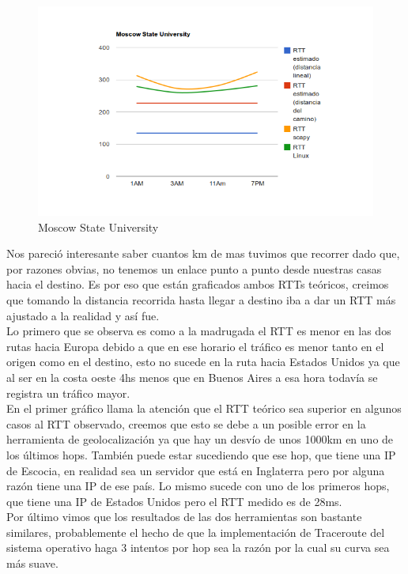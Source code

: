 \begin{figure}[h!]
    \centering
    \includegraphics[width=400pt]{msu.png}
    \caption{Moscow State University}
    \label{fig:msu:count}
\end{figure}

\indent Nos pareció interesante saber cuantos km de mas tuvimos que recorrer dado que, por razones obvias, no tenemos un enlace punto a punto desde nuestras casas hacia el destino. Es por eso que están graficados ambos RTTs teóricos, creimos que tomando la distancia recorrida hasta llegar a destino iba a dar un RTT más ajustado a la realidad y así fue.\\

\indent Lo primero que se observa es como a la madrugada el RTT es menor en las dos rutas hacia Europa debido a que en ese horario el tráfico es menor tanto en el origen como en el destino, esto no sucede en la ruta hacia Estados Unidos ya que al ser en la costa oeste 4hs menos que en Buenos Aires a esa hora todavía se registra un tráfico mayor.\\

\indent En el primer gráfico llama la atención que el RTT teórico sea superior en algunos casos al RTT observado, creemos que esto se debe a un posible error en la herramienta de geolocalización ya que hay un desvío de unos 1000km en uno de los últimos hops. También puede estar sucediendo que ese hop, que tiene una IP de Escocia, en realidad sea un servidor que está en Inglaterra pero por alguna razón tiene una IP de ese país. Lo mismo sucede con uno de los primeros hops, que tiene una IP de Estados Unidos pero el RTT medido es de 28ms.\\

\indent Por último vimos que los resultados de las dos herramientas son bastante similares, probablemente el hecho de que la implementación de Traceroute del sistema operativo haga 3 intentos por hop sea la razón por la cual su curva sea más suave.\\

